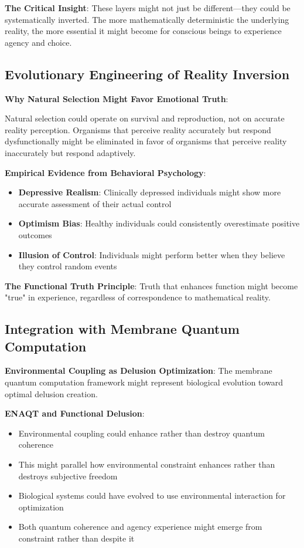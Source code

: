 \documentclass[12pt]{article}
\begin{document}
\textbf{The Critical Insight}: These layers might not just be different—they could be systematically inverted. The more mathematically deterministic the underlying reality, the more essential it might become for conscious beings to experience agency and choice.

\subsection{Evolutionary Engineering of Reality Inversion}

\textbf{Why Natural Selection Might Favor Emotional Truth}:

Natural selection could operate on survival and reproduction, not on accurate reality perception. Organisms that perceive reality accurately but respond dysfunctionally might be eliminated in favor of organisms that perceive reality inaccurately but respond adaptively.

\textbf{Empirical Evidence from Behavioral Psychology}:
\begin{itemize}
\item \textbf{Depressive Realism}: Clinically depressed individuals might show more accurate assessment of their actual control
\item \textbf{Optimism Bias}: Healthy individuals could consistently overestimate positive outcomes
\item \textbf{Illusion of Control}: Individuals might perform better when they believe they control random events
\end{itemize}

\textbf{The Functional Truth Principle}: Truth that enhances function might become "true" in experience, regardless of correspondence to mathematical reality.

\subsection{Integration with Membrane Quantum Computation}

\textbf{Environmental Coupling as Delusion Optimization}: The membrane quantum computation framework might represent biological evolution toward optimal delusion creation.

\textbf{ENAQT and Functional Delusion}:
\begin{itemize}
\item Environmental coupling could enhance rather than destroy quantum coherence
\item This might parallel how environmental constraint enhances rather than destroys subjective freedom
\item Biological systems could have evolved to use environmental interaction for optimization
\item Both quantum coherence and agency experience might emerge from constraint rather than despite it
\end{itemize}
\end{document}
